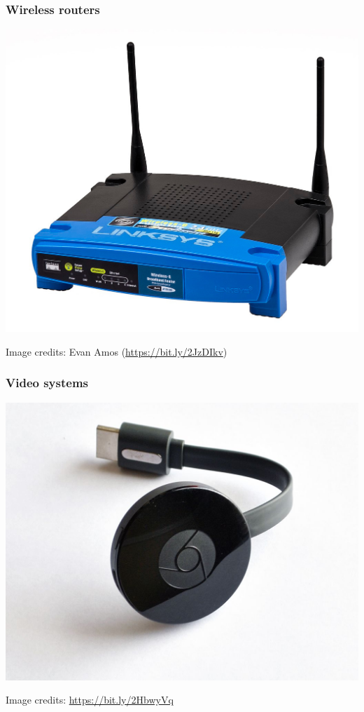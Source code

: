 \begin{frame}
  \frametitle{Wireless routers}
  \begin{center}
    \includegraphics[height=0.8\textheight]{slides/sysdev-intro/linksys-wireless-router.jpg}
  \end{center}
  \tiny
  Image credits: Evan Amos (\url{https://bit.ly/2JzDIkv})
\end{frame}

\begin{frame}
\frametitle{Video systems}
  \begin{center}
    \includegraphics[height=0.8\textheight]{slides/sysdev-intro/chromecast-2015.jpg}
  \end{center}
  \tiny Image credits: \url{https://bit.ly/2HbwyVq}
\end{frame}

